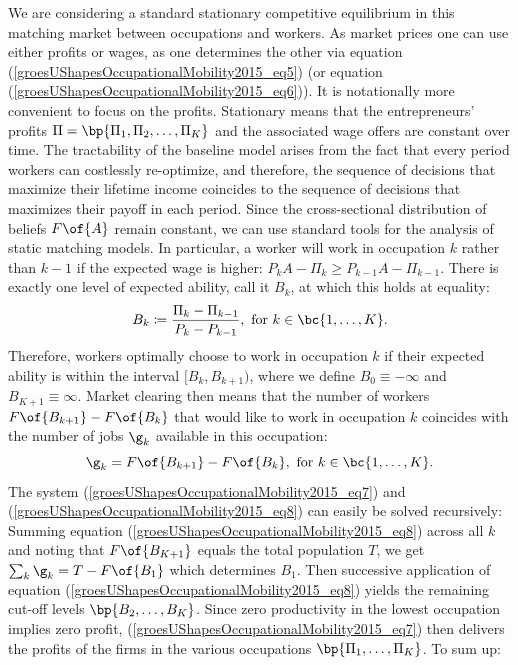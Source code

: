 \documentclass[12pt]{article}
\theoremstyle{definition}
\begin{document}
We are considering a standard stationary competitive equilibrium in this matching market between occupations and workers. As market prices one can use either profits or wages, as one determines the other via equation (\ref{groesUShapesOccupationalMobility2015_eq5}) (or equation (\ref{groesUShapesOccupationalMobility2015_eq6})). It is notationally more convenient to focus on the profits. Stationary means that the entrepreneurs' profits $\Pi = \bp{\Pi_1, \Pi_2, \ldots, \Pi_K}$ and the associated wage offers are constant over time. The tractability of the baseline model arises from the fact that every period workers can costlessly re-optimize, and therefore, the sequence of decisions that maximize their lifetime income coincides to the sequence of decisions that maximizes their payoff in each period. Since the cross-sectional distribution of beliefs $F\of{A}$ remain constant, we can use standard tools for the analysis of static matching models. In particular, a worker will work in occupation $k$ rather than $k-1$ if the expected wage is higher: $P_k A - \Pi_k \geq P_{k-1} A - \Pi_{k-1}$. There is exactly one level of expected ability, call it $B_k$, at which this holds at equality:
\begin{equation}
    \label{groesUShapesOccupationalMobility2015_eq7}
    B_{k} \coloneqq \frac{\Pi_{k} - \Pi_{k-1}}{P_{k} - P_{k-1}}, \text{ for } k \in \bc{1, \ldots, K}.
\end{equation}
Therefore, workers optimally choose to work in occupation $k$ if their expected ability is within the interval $[B_k, B_{k+1})$, where we define $B_0 \equiv - \infty$ and $B_{K+1} \equiv \infty$. Market clearing then means that the number of workers $F\of{B_{k+1}} - F\of{B_k}$ that would like to work in occupation $k$ coincides with the number of jobs $\g_k$ available in this occupation:
\begin{equation}
    \label{groesUShapesOccupationalMobility2015_eq8}
    \g_k = F\of{B_{k+1}} - F\of{B_k}, \text{ for } k \in \bc{1, \ldots, K}.
\end{equation}
The system (\ref{groesUShapesOccupationalMobility2015_eq7}) and (\ref{groesUShapesOccupationalMobility2015_eq8}) can easily be solved recursively: Summing equation (\ref{groesUShapesOccupationalMobility2015_eq8}) across all $k$ and noting that $F\of{B_{K+1}}$ equals the total population $T$, we get $\sum_{k} \g_k = T - F\of{B_1}$ which determines $B_1$. Then successive application of equation (\ref{groesUShapesOccupationalMobility2015_eq8}) yields the remaining cut-off levels $\bp{B_2, \ldots, B_K}$. Since zero productivity in the lowest occupation implies zero profit, (\ref{groesUShapesOccupationalMobility2015_eq7}) then delivers the profits of the firms in the various occupations $\bp{\Pi_1, \ldots, \Pi_K}$. To sum up:
\end{document}
